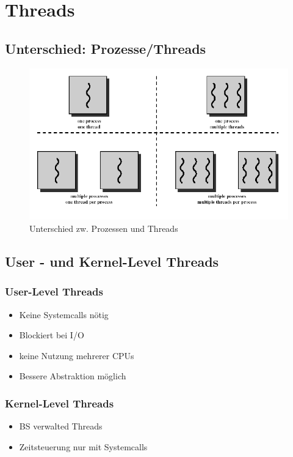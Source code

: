 \section{Threads}

\subsection{Unterschied: Prozesse/Threads}

\begin{figure}[ht!]
    \includegraphics[width=\linewidth]{pics/processes_vs_threads}
    \caption{Unterschied zw. Prozessen und Threads}
\end{figure}

\subsection{User - und Kernel-Level Threads}

\subsubsection{User-Level Threads}
\begin{itemize}
    \item Keine Systemcalls nötig
    \item Blockiert bei I/O
    \item keine Nutzung mehrerer CPUs
    \item Bessere Abstraktion möglich
\end{itemize}

\subsubsection{Kernel-Level Threads}
\begin{itemize}
    \item BS verwalted Threads
    \item Zeitsteuerung nur mit Systemcalls
\end{itemize}

